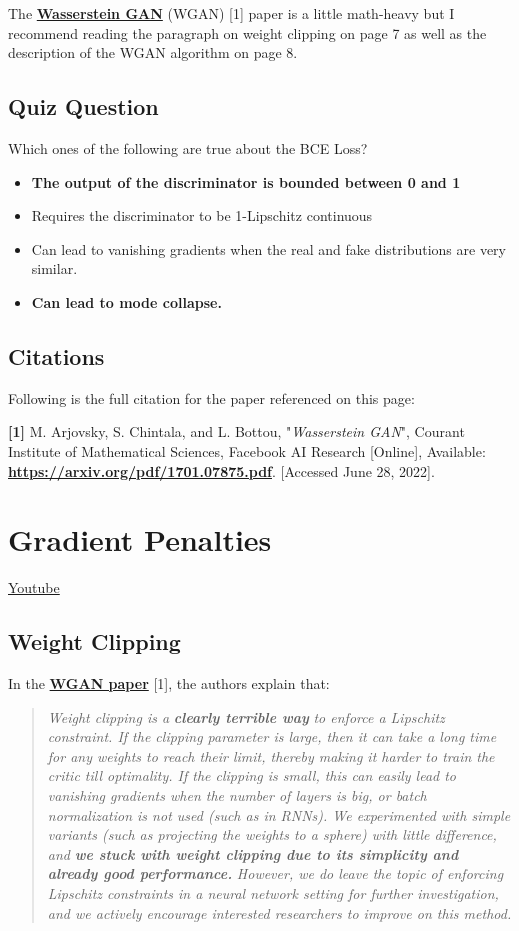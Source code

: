 The \href{https://arxiv.org/pdf/1701.07875.pdf}{\textbf{Wasserstein GAN}} (WGAN) [1] paper is a little math-heavy but I recommend reading the paragraph on weight clipping on page 7 as well as the description of the WGAN algorithm on page 8.

\subsection{Quiz Question}
Which ones of the following are true about the BCE Loss?
\begin{itemize}
    \item \textbf{The output of the discriminator is bounded between 0 and 1}
    \item Requires the discriminator to be 1-Lipschitz continuous
    \item Can lead to vanishing gradients when the real and fake distributions are very similar.
    \item \textbf{Can lead to mode collapse.}
\end{itemize}

\subsection{Citations}
Following is the full citation for the paper referenced on this page:

\textbf{[1]} M. Arjovsky, S. Chintala, and L. Bottou, "\textit{Wasserstein GAN}", Courant Institute of Mathematical Sciences, Facebook AI Research [Online], Available: \href{https://arxiv.org/pdf/1701.07875.pdf}{\textbf{https://arxiv.org/pdf/1701.07875.pdf}}. [Accessed June 28, 2022].

\section{Gradient Penalties}
\href{https://www.youtube.com/watch?v=NqEUeISsqs8&t=5s}{Youtube} 
\subsection{Weight Clipping}
In the \href{https://arxiv.org/pdf/1701.07875.pdf}{\textbf{WGAN paper}} [1], the authors explain that:

\begin{quote}
\textit{Weight clipping is a} \textit{\textbf{clearly terrible way}} \textit{to enforce a Lipschitz constraint. If the clipping parameter is large, then it can take a long time for any weights to reach their limit, thereby making it harder to train the critic till optimality. If the clipping is small, this can easily lead to vanishing gradients when the number of layers is big, or batch normalization is not used (such as in RNNs). We experimented with simple variants (such as projecting the weights to a sphere) with little difference, and} \textit{\textbf{we stuck with weight clipping due to its simplicity and already good performance.}} \textit{However, we do leave the topic of enforcing Lipschitz constraints in a neural network setting for further investigation, and we actively encourage interested researchers to improve on this method.}

\end{quote}
